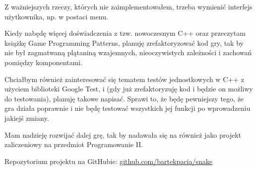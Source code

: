 \documentclass[12pt]{article}
\begin{document}
Z ważniejszych rzeczy, których nie zaimplementowałem, trzeba wymienić interfejs
użytkownika, np. w postaci menu.

Kiedy nabędę więcej doświadczenia z tzw. nowoczesnym C++ oraz przeczytam książkę
Game Programming Patterns, planuję zrefaktoryzować kod gry, tak by nie był
zagmatwaną plątaniną wzajemnych, nieoczywistych zależności i zachowań pomiędzy
komponentami.

Chciałbym również zainteresować się tematem testów jednostkowych w C++ z użyciem
biblioteki Google Test, i (gdy już zrefaktoryzuję kod i będzie on możliwy do
testowania), planuję takowe napisać. Sprawi to, że będę pewniejszy tego, że gra
działa poprawnie i nie będę testować wszystkich jej funkcji po wprowadzeniu
jakiejś zmiany.

Mam nadzieję rozwijać dalej grę, tak by nadawała się na również jako projekt
zaliczeniowy na przedmiot Programowanie II.


Repozytorium projektu na GitHubie:
\href{https://github.com/bartekpacia/snake}{github.com/bartekpacia/snake}
\end{document}
